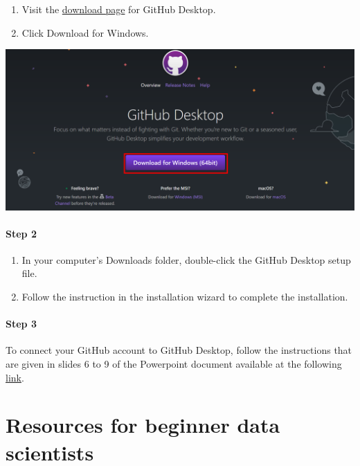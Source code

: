 \documentclass[
  letterpaper,
  DIV=11,
  numbers=noendperiod,
  oneside]{scrreprt}
\providecommand{\tightlist}{%
  \setlength{\itemsep}{0pt}\setlength{\parskip}{0pt}}\usepackage{longtable,booktabs,array}
\begin{document}
\begin{enumerate}
\def\labelenumi{\arabic{enumi}.}
\tightlist
\item
  Visit the \href{https://desktop.github.com/}{download page} for GitHub
  Desktop.
\item
  Click Download for Windows.
\end{enumerate}

\includegraphics{./images/paste-465BAC3C.png}

\hypertarget{step-2-5}{%
\subsubsection{Step 2}\label{step-2-5}}

\begin{enumerate}
\def\labelenumi{\arabic{enumi}.}
\tightlist
\item
  In your computer's Downloads folder, double-click the GitHub Desktop
  setup file.
\item
  Follow the instruction in the installation wizard to complete the
  installation.
\end{enumerate}

\hypertarget{step-3-4}{%
\subsubsection{Step 3}\label{step-3-4}}

To connect your GitHub account to GitHub Desktop, follow the
instructions that are given in slides 6 to 9 of the Powerpoint document
available at the following
\href{https://drive.switch.ch/index.php/s/1eFnksrX0UtjfZV}{link}.

\hypertarget{sec-useful-resources}{%
\chapter{Resources for beginner data
scientists}\label{sec-useful-resources}}
\end{document}
